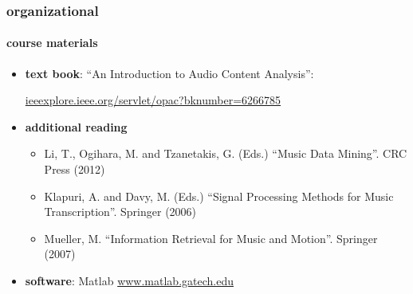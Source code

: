         \begin{frame}\frametitle{organizational}\framesubtitle{course materials}
            \begin{itemize}
                \item   \textbf{text book}: ``An Introduction to Audio Content Analysis'':
                
                    \url{ieeexplore.ieee.org/servlet/opac?bknumber=6266785}

                \smallskip
                \item<2->  \textbf{additional reading}
                    \begin{itemize}
                        \item   Li, T., Ogihara, M. and Tzanetakis, G.  (Eds.) ``Music Data Mining''. CRC Press (2012)
                        \item   Klapuri, A. and Davy, M. (Eds.) ``Signal Processing Methods for Music Transcription''. Springer (2006)
                        \item   Mueller, M. ``Information Retrieval for Music and Motion''. Springer (2007)
                    \end{itemize}

                \smallskip
                \item<3->   \textbf{software}: Matlab
                    \url{www.matlab.gatech.edu}
            \end{itemize}
        \end{frame}

